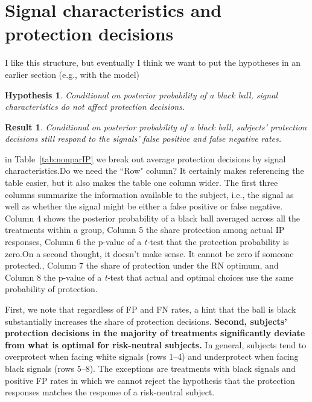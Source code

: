\documentclass[12pt,a4paper]{article}
\newcommand{\aut}[1]{{\color{Red}#1}}
\newcommand{\pmt}[1]{{\color{Blue}#1}}
\newtheorem{hypothesis}{Hypothesis}
\newtheorem{result}{Result}
\begin{document}
\section{Signal characteristics and protection decisions} 
\pmt{I like this structure, but eventually I think we want to put the hypotheses in an earlier section (e.g., with the model)}
\begin{hypothesis} Conditional on posterior probability of a black ball, signal characteristics do not affect protection decisions. \end{hypothesis}
\begin{result}\label{res:IPdeviations} %
Conditional on posterior probability of a black ball, subjects' protection decisions still respond to the signals' false positive and false negative rates. \end{result}

in Table~\ref{tab:nonparIP} we break out average protection decisions by signal characteristics.\pmt{Do we need the ``Row" column?  It certainly makes referencing the table easier, but it also makes the table one column wider.} The first three columns summarize the information available to the subject, i.e., the signal as well as whether the signal might be either a false positive or false negative. Column 4 shows the posterior probability of a black ball averaged across all the treatments within a group, Column 5 the share protection among actual IP responses, Column 6 the p-value of a \emph{t-}test that the protection probability is zero.\aut{On a second thought, it doesn't make sense. It cannot be zero if someone protected.}, Column 7 the share of protection under the RN optimum, and Column 8 the p-value of a \emph{t-}test that actual and optimal choices use the same probability of protection.

First, we note that regardless of FP and FN rates, a hint that the ball is black substantially increases the share of protection decisions.  \textbf{Second, subjects' protection decisions in the majority of treatments significantly deviate from what is optimal for risk-neutral subjects.}  In general, subjects tend to overprotect when facing white signals (rows 1--4) and underprotect when facing black signals (rows 5--8). The exceptions are treatments with black signals and positive FP rates in which we cannot reject the hypothesis that the protection responses matches the response of a risk-neutral subject. 
\end{document}
